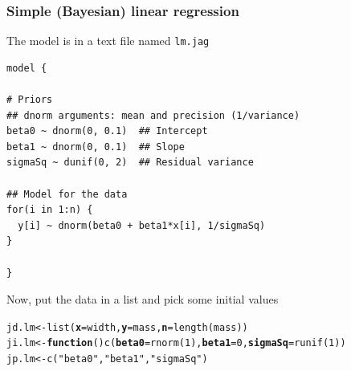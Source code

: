 \documentclass[color=usenames,dvipsnames]{beamer}\usepackage[]{graphicx}\usepackage[]{color}
\makeatletter
\newcommand{\hlnum}[1]{\textcolor[rgb]{0.69,0.494,0}{#1}}%
\newcommand{\hlstr}[1]{\textcolor[rgb]{0.749,0.012,0.012}{#1}}%
\newcommand{\hlstd}[1]{\textcolor[rgb]{0,0,0}{#1}}%
\newcommand{\hlkwa}[1]{\textcolor[rgb]{0,0,0}{\textbf{#1}}}%
\newcommand{\hlkwb}[1]{\textcolor[rgb]{0,0.341,0.682}{#1}}%
\newcommand{\hlkwc}[1]{\textcolor[rgb]{0,0,0}{\textbf{#1}}}%
\newcommand{\hlkwd}[1]{\textcolor[rgb]{0.004,0.004,0.506}{#1}}%
\newenvironment{kframe}{%
 \def\at@end@of@kframe{}%
 \ifinner\ifhmode%
  \def\at@end@of@kframe{\end{minipage}}%
  \begin{minipage}{\columnwidth}%
 \fi\fi%
 \def\FrameCommand##1{\hskip\@totalleftmargin \hskip-\fboxsep
 \colorbox{shadecolor}{##1}\hskip-\fboxsep
     \hskip-\linewidth \hskip-\@totalleftmargin \hskip\columnwidth}%
 \MakeFramed {\advance\hsize-\width
   \@totalleftmargin\z@ \linewidth\hsize
   \@setminipage}}%
 {\par\unskip\endMakeFramed%
 \at@end@of@kframe}
\newenvironment{knitrout}{}{} %
\makeatother
\begin{document}
\begin{frame}[fragile]
  \frametitle{Simple (Bayesian) linear regression}
  \small
  The model is in a text file named {\tt lm.jag} \\
\begin{knitrout}\scriptsize
{}\color{fgcolor}\begin{kframe}
\begin{verbatim}
model {

# Priors
## dnorm arguments: mean and precision (1/variance)
beta0 ~ dnorm(0, 0.1)  ## Intercept  
beta1 ~ dnorm(0, 0.1)  ## Slope
sigmaSq ~ dunif(0, 2)  ## Residual variance

## Model for the data
for(i in 1:n) {
  y[i] ~ dnorm(beta0 + beta1*x[i], 1/sigmaSq)
}

}
\end{verbatim}
\end{kframe}
\end{knitrout}
\pause
\vfill
Now, put the data in a list and pick some initial values
\begin{knitrout}\footnotesize
{}\color{fgcolor}\begin{kframe}
\begin{alltt}
\hlstd{jd.lm} \hlkwb{<-} \hlkwd{list}\hlstd{(}\hlkwc{x}\hlstd{=width,} \hlkwc{y}\hlstd{=mass,} \hlkwc{n}\hlstd{=}\hlkwd{length}\hlstd{(mass))}
\hlstd{ji.lm} \hlkwb{<-} \hlkwa{function}\hlstd{()} \hlkwd{c}\hlstd{(}\hlkwc{beta0}\hlstd{=}\hlkwd{rnorm}\hlstd{(}\hlnum{1}\hlstd{),} \hlkwc{beta1}\hlstd{=}\hlnum{0}\hlstd{,} \hlkwc{sigmaSq}\hlstd{=}\hlkwd{runif}\hlstd{(}\hlnum{1}\hlstd{))}
\hlstd{jp.lm} \hlkwb{<-} \hlkwd{c}\hlstd{(}\hlstr{"beta0"}\hlstd{,} \hlstr{"beta1"}\hlstd{,} \hlstr{"sigmaSq"}\hlstd{)}
\end{alltt}
\end{kframe}
\end{knitrout}
\end{frame}
\end{document}
